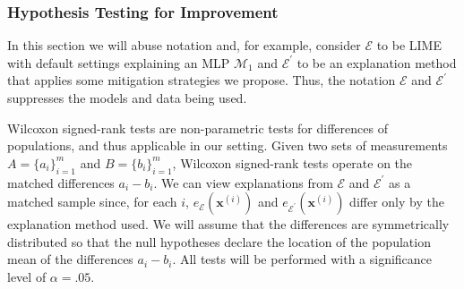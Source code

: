 \documentclass[mnsc,blindrev]{informs3}
\newcommand{\mE}{\mathcal{E}}
\begin{document}
        \subsubsection{Hypothesis Testing for Improvement}
            \label{sec:hypothesis_testing}
            In this section we will abuse notation and, for example, consider $\mE$ to be LIME with default settings explaining an MLP $\mathcal{M}_1$ and $\mE^\prime$ to be an explanation method that applies some mitigation strategies we propose. Thus, the notation $\mE$ and $\mE^\prime$ suppresses the models and data being used.
            
            Wilcoxon signed-rank tests are non-parametric tests for differences of populations, and thus applicable in our setting. Given two sets of measurements $A=\{a_i\}_{i=1}^m$ and $B=\{b_i\}_{i=1}^m$, Wilcoxon signed-rank tests operate on the matched differences $a_i-b_i$. We can view explanations from $\mE$ and $\mE^\prime$ as a matched sample since, for each $i$, $e_{\mE}(\mathbf{x}^{(i)})$ and $e_{\mE^\prime}(\mathbf{x}^{(i)})$ differ only by the explanation method used. We will assume that the differences are symmetrically distributed so that the null hypotheses declare the location of the population mean of the differences $a_i - b_i$. All tests will be performed with a significance level of $\alpha=.05$.
   
\end{document}
